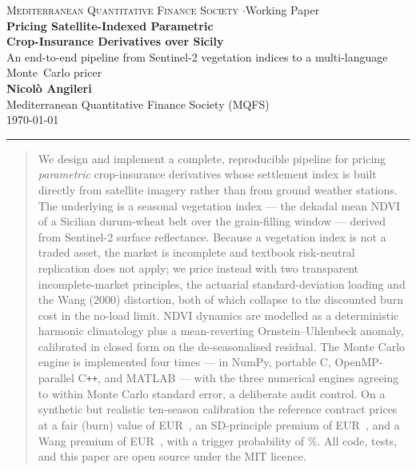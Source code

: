 \documentclass[11pt]{article}
\begin{document}
\begin{center}
  {\footnotesize\color{mqfsgrey}\textsc{Mediterranean Quantitative Finance Society} \quad$\cdot$\quad Working Paper}\\[0.4em]
  {\LARGE\bfseries\color{mqfsnavy} Pricing Satellite-Indexed Parametric\\[0.15em]
   Crop-Insurance Derivatives over Sicily}\\[0.7em]
  {\large An end-to-end pipeline from Sentinel-2 vegetation indices to a multi-language Monte~Carlo pricer}\\[1.0em]
  {\normalsize\bfseries Nicol\`o Angileri}\\[0.2em]
  {\footnotesize Mediterranean Quantitative Finance Society (MQFS)}\\[0.2em]
  {\footnotesize\color{mqfsgrey}\today}
\end{center}
\vspace{0.4em}
\hrule height 0.8pt
\vspace{0.9em}

\begin{abstract}
\noindent
We design and implement a complete, reproducible pipeline for pricing
\emph{parametric} crop-insurance derivatives whose settlement index is built
directly from satellite imagery rather than from ground weather stations. The
underlying is a seasonal vegetation index --- the dekadal mean NDVI of a Sicilian
durum-wheat belt over the grain-filling window --- derived from Sentinel-2
surface reflectance. Because a vegetation index is not a traded asset, the
market is incomplete and textbook risk-neutral replication does not apply; we
price instead with two transparent incomplete-market principles, the actuarial
standard-deviation loading and the Wang (2000) distortion, both of which collapse
to the discounted burn cost in the no-load limit. NDVI dynamics are modelled as a
deterministic harmonic climatology plus a mean-reverting Ornstein--Uhlenbeck
anomaly, calibrated in closed form on the de-seasonalised residual. The Monte
Carlo engine is implemented four times --- in NumPy, portable C, OpenMP-parallel
C\texttt{++}, and MATLAB --- with the three numerical engines agreeing to within
Monte Carlo standard error, a deliberate audit control. On a synthetic but
realistic ten-season calibration the reference contract prices at a fair (burn)
value of EUR~\resFair{}, an SD-principle premium of EUR~\resSD{}, and a Wang
premium of EUR~\resWang{}, with a trigger probability of \resTrigger\%. All code,
tests, and this paper are open source under the MIT licence.
\end{abstract}
\end{document}
